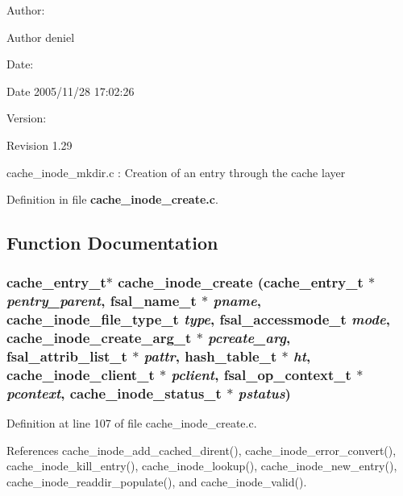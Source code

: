 \begin{Desc}
\item[Author:]\begin{Desc}
\item[Author]deniel \end{Desc}
\end{Desc}
\begin{Desc}
\item[Date:]\begin{Desc}
\item[Date]2005/11/28 17:02:26 \end{Desc}
\end{Desc}
\begin{Desc}
\item[Version:]\begin{Desc}
\item[Revision]1.29 \end{Desc}
\end{Desc}
cache\_\-inode\_\-mkdir.c : Creation of an entry through the cache layer

Definition in file {\bf cache\_\-inode\_\-create.c}.

\subsection{Function Documentation}
\subsubsection{\setlength{\rightskip}{0pt plus 5cm}cache\_\-entry\_\-t$\ast$ cache\_\-inode\_\-create (cache\_\-entry\_\-t $\ast$ {\em pentry\_\-parent}, fsal\_\-name\_\-t $\ast$ {\em pname}, cache\_\-inode\_\-file\_\-type\_\-t {\em type}, fsal\_\-accessmode\_\-t {\em mode}, cache\_\-inode\_\-create\_\-arg\_\-t $\ast$ {\em pcreate\_\-arg}, fsal\_\-attrib\_\-list\_\-t $\ast$ {\em pattr}, hash\_\-table\_\-t $\ast$ {\em ht}, cache\_\-inode\_\-client\_\-t $\ast$ {\em pclient}, fsal\_\-op\_\-context\_\-t $\ast$ {\em pcontext}, cache\_\-inode\_\-status\_\-t $\ast$ {\em pstatus})}\label{cache__inode__create_8c_a0}




Definition at line 107 of file cache\_\-inode\_\-create.c.

References cache\_\-inode\_\-add\_\-cached\_\-dirent(), cache\_\-inode\_\-error\_\-convert(), cache\_\-inode\_\-kill\_\-entry(), cache\_\-inode\_\-lookup(), cache\_\-inode\_\-new\_\-entry(), cache\_\-inode\_\-readdir\_\-populate(), and cache\_\-inode\_\-valid().